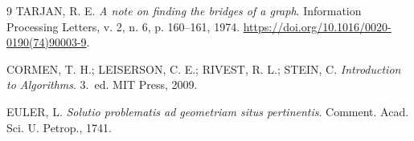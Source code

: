 \documentclass[a4paper,11pt]{article}
\begin{document}
\begin{thebibliography}{9}
TARJAN, R. E.
\emph{A note on finding the bridges of a graph}.
Information Processing Letters, v. 2, n. 6, p. 160--161, 1974.
\href{https://doi.org/10.1016/0020-0190(74)90003-9}{https://doi.org/10.1016/0020-0190(74)90003-9}.

CORMEN, T. H.; LEISERSON, C. E.; RIVEST, R. L.; STEIN, C.
\emph{Introduction to Algorithms}. 3.~ed. MIT Press, 2009.

EULER, L.
\emph{Solutio problematis ad geometriam situs pertinentis}. Comment. Acad. Sci. U. Petrop., 1741.
\end{thebibliography}
\end{document}
